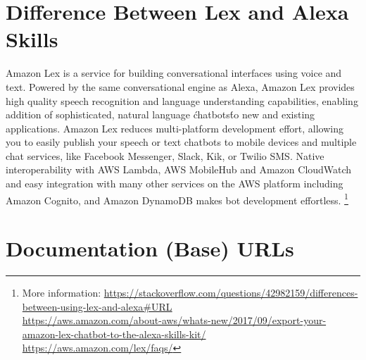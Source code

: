 
\section*{Difference Between Lex and Alexa Skills}
\label{lexAlexa}  

Amazon Lex is a service for building conversational interfaces using voice and text. Powered by the same conversational engine as Alexa, Amazon Lex provides high quality speech recognition and language understanding capabilities, enabling addition of sophisticated, natural language \'chatbots\' to new and existing applications. Amazon Lex reduces multi-platform development effort, allowing you to easily publish your speech or text chatbots to mobile devices and multiple chat services, like Facebook Messenger, Slack, Kik, or Twilio SMS. Native interoperability with AWS Lambda, AWS MobileHub and Amazon CloudWatch and easy integration with many other services on the AWS platform including Amazon Cognito, and Amazon DynamoDB makes bot development effortless. \footnote{
More information: \url{https://stackoverflow.com/questions/42982159/differences-between-using-lex-and-alexa\#URL}\\
\url{https://aws.amazon.com/about-aws/whats-new/2017/09/export-your-amazon-lex-chatbot-to-the-alexa-skills-kit/}\\
\url{https://aws.amazon.com/lex/faqs/}
}









\clearpage

\section*{Documentation (Base) URLs}

%



